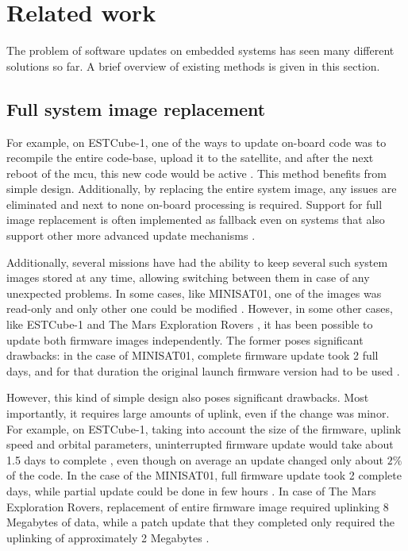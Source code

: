 \newpage
\section{Related work}

The problem
of software updates on embedded systems has seen many different solutions so far. A brief overview of existing methods is given in this section.

\subsection{Full system image replacement}

For example, on ESTCube-1, one of the ways to update on-board code was to recompile the entire code-base, upload it to the satellite, and after the next reboot of the \gls{mcu}, this new code would be active \cite{Suenter2016}. This method benefits from simple design. Additionally, by replacing the entire system image, any
 issues are eliminated and next to none on-board processing is required. Support for full image replacement is often implemented as fallback even on systems that also support other more advanced update mechanisms \cite{Tarbe2013,Greco2005,Garrido1998}.

Additionally, several missions have had the ability to keep several such system images stored at any time, allowing switching between them in case of any unexpected problems. In some cases, like MINISAT01, one of the images was read-only and only other one could be modified \cite{Garrido1998}. However, in some other cases, like  ESTCube-1 \cite{Tarbe2013} and The Mars Exploration Rovers \cite{Greco2005}, it has been possible to update both firmware images independently. The former poses significant drawbacks: in the case of MINISAT01, complete firmware update took 2 full days, and for that duration the original launch firmware version had to be used \cite{Garrido1998}.

However, this kind of simple design also poses significant drawbacks. Most importantly, it requires large amounts of uplink, even if the change was minor. For example, on ESTCube-1, taking into account the size of the firmware, uplink speed and orbital parameters, uninterrupted firmware update would take about 1.5 days to complete \cite{Suenter2014}, even though on average an update changed only about $2\%$ of the code. In the case of the MINISAT01, full firmware update took 2 complete days, while partial update could be done in few hours \cite{Garrido1998}. In case of The Mars Exploration Rovers, replacement of entire firmware image required uplinking 8 Megabytes of data, while a patch update that they completed only required the uplinking of approximately 2 Megabytes \cite{Greco2005}.

